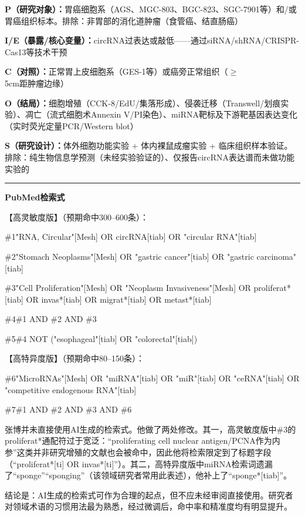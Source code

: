 \begin{aibox}
\textbf{P（研究对象）：}胃癌细胞系（AGS、MGC-803、BGC-823、SGC-7901等）和/或胃癌组织标本。排除：非胃部的消化道肿瘤（食管癌、结直肠癌）

\textbf{I/E（暴露/核心变量）：}circRNA过表达或敲低——通过siRNA/shRNA/CRISPR-Cas13等技术干预

\textbf{C（对照）：}正常胃上皮细胞系（GES-1等）或癌旁正常组织（\(\geq\)5cm距肿瘤边缘）

\textbf{O（结局）：}细胞增殖（CCK-8/EdU/集落形成）、侵袭迁移（Transwell/划痕实验）、凋亡（流式细胞术Annexin V/PI染色）、miRNA靶标及下游靶基因表达变化（实时荧光定量PCR/Western blot）

\textbf{S（研究设计）：}体外细胞功能实验 + 体内裸鼠成瘤实验 + 临床组织样本验证。排除：纯生物信息学预测（未经实验验证的）、仅报告circRNA表达谱而未做功能实验的

\smallskip
\noindent\rule{\linewidth}{0.4pt}
\smallskip

\textbf{PubMed检索式}

【高灵敏度版】（预期命中300--600条）：

{\ttfamily\small\setlength{\parskip}{0pt}
\#1\quad "RNA, Circular"[Mesh] OR circRNA[tiab] OR "circular RNA"[tiab]

\#2\quad "Stomach Neoplasms"[Mesh] OR "gastric cancer"[tiab] OR "gastric carcinoma"[tiab]

\#3\quad "Cell Proliferation"[Mesh] OR "Neoplasm Invasiveness"[Mesh] OR proliferat*[tiab] OR invas*[tiab] OR migrat*[tiab] OR metast*[tiab]

\#4\quad \#1 AND \#2 AND \#3

\#5\quad \#4 NOT ("esophageal"[tiab] OR "colorectal"[tiab])
}

【高特异度版】（预期命中80--150条）：

{\ttfamily\small\setlength{\parskip}{0pt}
\#6\quad "MicroRNAs"[Mesh] OR "miRNA"[tiab] OR "miR"[tiab] OR "ceRNA"[tiab] OR "competitive endogenous RNA"[tiab]

\#7\quad \#1 AND \#2 AND \#3 AND \#6
}
\end{aibox}

\begin{critiquebox}
张博并未直接使用AI生成的检索式。他做了两处修改。其一，高灵敏度版中\#3的proliferat*通配符过于宽泛：``proliferating cell nuclear antigen/PCNA作为内参''这类并非研究增殖的文献也会被命中，因此他将检索限定到了标题字段（``proliferat*[ti] OR invas*[ti]''）。其二，高特异度版中miRNA检索词遗漏了``sponge''``sponging''（该领域研究者常用此表述），他补上了``sponge*[tiab]''。

结论是：AI生成的检索式可作为合理的起点，但不应未经审阅直接使用。研究者对领域术语的习惯用法最为熟悉，经过微调后，命中率和精准度均有明显提升。
\end{critiquebox}

